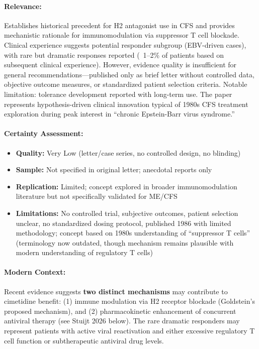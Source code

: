 \paragraph{Relevance:}
Establishes historical precedent for H2 antagonist use in CFS and provides mechanistic rationale for immunomodulation via suppressor T cell blockade. Clinical experience suggests potential responder subgroup (EBV-driven cases), with rare but dramatic responses reported (~1--2\% of patients based on subsequent clinical experience). However, evidence quality is insufficient for general recommendations---published only as brief letter without controlled data, objective outcome measures, or standardized patient selection criteria. Notable limitation: tolerance development reported with long-term use. The paper represents hypothesis-driven clinical innovation typical of 1980s CFS treatment exploration during peak interest in ``chronic Epstein-Barr virus syndrome.''

\paragraph{Certainty Assessment:}
\begin{itemize}
    \item \textbf{Quality:} Very Low (letter/case series, no controlled design, no blinding)
    \item \textbf{Sample:} Not specified in original letter; anecdotal reports only
    \item \textbf{Replication:} Limited; concept explored in broader immunomodulation literature but not specifically validated for ME/CFS
    \item \textbf{Limitations:} No controlled trial, subjective outcomes, patient selection unclear, no standardized dosing protocol, published 1986 with limited methodology; concept based on 1980s understanding of ``suppressor T cells'' (terminology now outdated, though mechanism remains plausible with modern understanding of regulatory T cells)
\end{itemize}

\paragraph{Modern Context:}
Recent evidence suggests \textbf{two distinct mechanisms} may contribute to cimetidine benefit: (1) immune modulation via H2 receptor blockade (Goldstein's proposed mechanism), and (2) pharmacokinetic enhancement of concurrent antiviral therapy (see Stuijt 2026 below). The rare dramatic responders may represent patients with active viral reactivation and either excessive regulatory T cell function or subtherapeutic antiviral drug levels.

